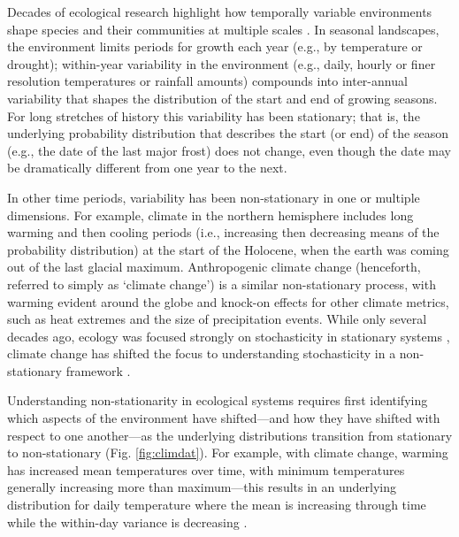 \documentclass[11pt,letterpaper]{article}
\begin{document}
Decades of ecological research highlight how temporally variable environments shape species and their communities at multiple scales \citep{Sale:1977oq,Chesson:1997dz}.  In seasonal landscapes, the environment limits periods for growth each year (e.g., by temperature or drought); within-year variability in the environment (e.g., daily, hourly or finer resolution temperatures or rainfall amounts) compounds into inter-annual variability that shapes the distribution of the start and end of growing seasons. For long stretches of history this variability has been stationary; that is, the underlying probability distribution that describes the start (or end) of the season (e.g., the date of the last major frost) does not change, even though the date may be dramatically different from one year to the  next. %

In other time periods, variability has been non-stationary in one or multiple dimensions. For example, climate in the northern hemisphere includes long warming and then cooling periods (i.e., increasing then decreasing means of the probability distribution) at the start of the Holocene, when the earth was coming out of the last glacial maximum. Anthropogenic climate change (henceforth, referred to simply as `climate change') is a similar non-stationary process, with warming evident around the globe and knock-on effects for other climate metrics, such as heat extremes and the size of precipitation events. While only several decades ago, ecology was focused strongly on stochasticity in stationary systems \citep[e.g.,][]{Ripa1996,Kaitala1997}, climate change has shifted the focus to understanding stochasticity in a non-stationary framework \citep[e.g.,][]{cazwavelets,ehrlen2016,legault2019}.

Understanding non-stationarity in ecological systems requires first identifying which aspects of the environment have shifted---and how they have shifted with respect to one another---as the underlying  distributions transition from stationary to non-stationary (Fig. \ref{fig:climdat}). For example, with climate change, warming has increased mean temperatures over time, with minimum temperatures generally increasing more than maximum---this results in an underlying distribution for daily temperature where the mean is increasing through time while the within-day variance is decreasing \citep{ipcc2013,screen2014}. 
\end{document}
